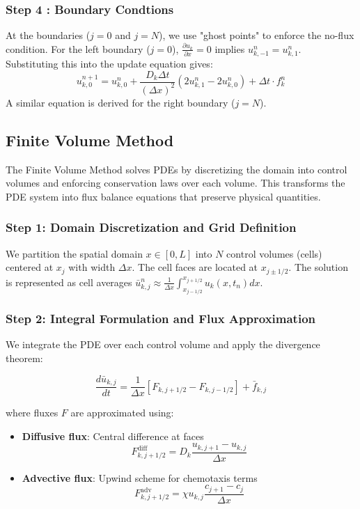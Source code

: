 \documentclass[conference]{IEEEtran}
\begin{document}
\subsubsection{Step 4 : Boundary Condtions}        


At the boundaries ($j=0$ and $j=N$), we use "ghost points" to enforce the no-flux condition. For the left boundary ($j=0$), $\frac{\partial u_k}{\partial x}=0$ implies $u_{k,-1}^n = u_{k,1}^n$. Substituting this into the update equation gives:
\begin{equation}
u_{k,0}^{n+1} = u_{k,0}^n + \frac{D_k \Delta t}{(\Delta x)^2} (2u_{k,1}^n - 2u_{k,0}^n) + \Delta t \cdot f_k^n
\end{equation}
A similar equation is derived for the right boundary ($j=N$).
\subsection{Finite Volume Method}
The Finite Volume Method solves PDEs by discretizing the domain into control volumes and enforcing conservation laws over each volume. This transforms the PDE system into flux balance equations that preserve physical quantities.

\subsubsection{Step 1: Domain Discretization and Grid Definition}

We partition the spatial domain $x\in[0,L]$ into $N$ control volumes (cells) centered at $x_j$ with width $\Delta x$. The cell faces are located at $x_{j\pm1/2}$. The solution is represented as cell averages $\bar{u}^n_{k,j} \approx \frac{1}{\Delta x}\int_{x_{j-1/2}}^{x_{j+1/2}} u_k(x,t_n)dx$.

\subsubsection{Step 2: Integral Formulation and Flux Approximation}

We integrate the PDE over each control volume and apply the divergence theorem:

\begin{equation}
\frac{d\bar{u}_{k,j}}{dt} = \frac{1}{\Delta x}\left[F_{k,j+1/2} - F_{k,j-1/2}\right] + \bar{f}_{k,j}
\end{equation}

where fluxes $F$ are approximated using:
\begin{itemize}
    \item \textbf{Diffusive flux}: Central difference at faces
    \[ F^{\text{diff}}_{k,j+1/2} = D_k\frac{u_{k,j+1} - u_{k,j}}{\Delta x} \]
    
    \item \textbf{Advective flux}: Upwind scheme for chemotaxis terms
    \[ F^{\text{adv}}_{k,j+1/2} = \chi u_{k,j}\frac{c_{j+1} - c_j}{\Delta x} \]
\end{itemize}
\end{document}
